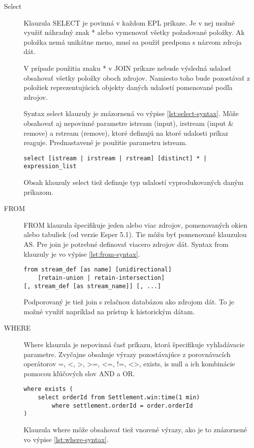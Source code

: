 		\begin{description}
			\item[Select] Klauzula SELECT je povinná v každom EPL príkaze. Je v nej možné využiť náhradný znak * alebo vymenovať všetky požadované položky. Ak položka nemá unikátne meno, musí sa použiť predpona s názvom zdroja dát. 
			
			V prípade použitia znaku * v JOIN príkaze nebude výsledná udalosť obsahovať všetky položky oboch zdrojov. Namiesto toho bude pozostávať z položiek reprezentujúcich objekty daných udalostí pomenované podľa zdrojov.
			
			Syntax select klauzuly je znázornená vo výpise \ref{lst:select-syntax}. Môže obsahovať aj nepovinné parametre istream (input), irstream (input \& remove) a rstream (remove), ktoré definujú na ktoré udalosti príkaz reaguje. Prednastavené je použitie parametru istream.

			\begin{lstlisting}[label=lst:select-syntax,caption=Syntax SELECT klauzuly \cite{web:esper-doc}]
select [istream | irstream | rstream] [distinct] * | expression_list
			\end{lstlisting}
			Obsah klauzuly select tiež definuje typ udalostí vyprodukovaných daným príkazom.
			
			\item[FROM] FROM klauzula špecifikuje jeden alebo viac zdrojov, pomenovaných okien alebo tabuliek (od verzie Esper 5.1). Tie môžu byť pomenované klauzulou AS. Pre join je potrebné definovať viacero zdrojov dát. Syntax from klauzuly je vo výpise \ref{lst:from-syntax}.
			\begin{lstlisting}[label=lst:from-syntax,caption=Syntax FROM klauzuly \cite{web:esper-doc}]
from stream_def [as name] [unidirectional]
	[retain-union | retain-intersection] 
[, stream_def [as stream_name]] [, ...]
			\end{lstlisting}
			Podporovaný je tiež join s relačnou databázou ako zdrojom dát. To je možné využiť napríklad na prístup k historickým dátam.
			
			\item[WHERE] Where klauzula je nepovinná časť príkazu, ktorá špecifikuje vyhľadávacie parametre. Zvyčajne obsahuje výrazy pozostávajúce z porovnávacích operátorov =, \textless , \textgreater , \textgreater=, \textless=, !=, \textless\textgreater, exists, is null a ich kombinácie pomocou kľúčových slov AND a OR.
			\begin{lstlisting}[label=lst:where-syntax,caption=Syntax WHERE klauzuly \cite{web:esper-doc}]
where exists (
	select orderId from Settlement.win:time(1 min) 
		where settlement.orderId = order.orderId
)
			\end{lstlisting}
			Klauzula where môže obsahovať tiež vnorené výrazy, ako je to znázornené vo výpise \ref{lst:where-syntax}.
			

\end{description}
